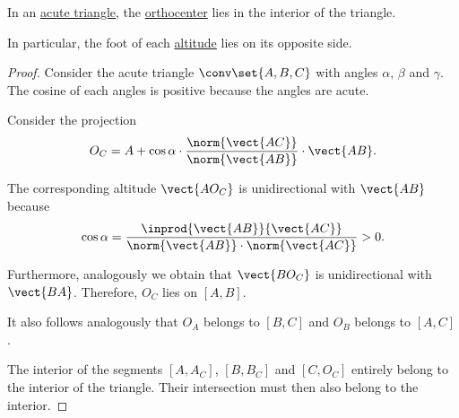 \begin{proposition}\label{thm:acute_triangle_orthocenter}
  In an \hyperref[def:triangle/measure/acute]{acute triangle}, the \hyperref[thm:orthocenter]{orthocenter} lies in the interior of the triangle.

  In particular, the foot of each \hyperref[def:triangle_altitude]{altitude} lies on its opposite side.
\end{proposition}
\begin{proof}
  Consider the acute triangle \( \conv\set{ A, B, C } \) with angles \( \alpha \), \( \beta \) and \( \gamma \). The cosine of each angles is positive because the angles are acute.

  Consider the projection
  \begin{equation*}
    O_C = A + \cos \alpha \cdot \frac {\norm{\vect{AC}}} {\norm{\vect{AB}}} \cdot \vect{AB}.
  \end{equation*}

  The corresponding altitude \( \vect{A O_C} \) is unidirectional with \( \vect{AB} \) because
  \begin{equation*}
    \cos \alpha = \frac {\inprod{ \vect{AB} } { \vect{AC}} } { \norm{\vect{AB}} \cdot \norm{\vect{AC}} } > 0.
  \end{equation*}

  Furthermore, analogously we obtain that \( \vect{B O_C} \) is unidirectional with \( \vect{BA} \). Therefore, \( O_C \) lies on \( [A, B] \).

  It also follows analogously that \( O_A \) belongs to \( [B, C] \) and \( O_B \) belongs to \( [A, C] \).

  The interior of the segments \( [A, A_C] \), \( [B, B_C] \) and \( [C, O_C] \) entirely belong to the interior of the triangle. Their intersection must then also belong to the interior.
\end{proof}

\begin{proposition}\label{thm:triangle_congruence}

  \begin{thmenum}
  \end{thmenum}
\end{proposition}

\begin{definition}\label{def:similar_figures}
\end{definition}

